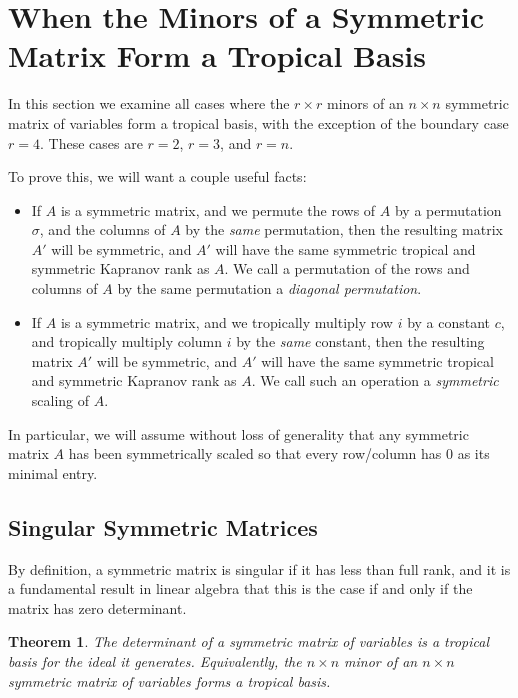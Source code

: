 \documentclass{article}
\begin{document}
\section{When the Minors of a Symmetric Matrix Form a Tropical Basis}

In this section we examine all cases where the $r \times r$ minors of an $n \times n$ symmetric matrix of variables form a tropical basis, with the exception of the boundary case $r = 4$. These cases are $r = 2$, $r = 3$, and $r = n$.

To prove this, we will want a couple useful facts:

\begin{itemize}
  
\item If $A$ is a symmetric matrix, and we permute the rows of $A$ by a permutation $\sigma$, and the columns of $A$ by the \emph{same} permutation, then the resulting matrix $A'$ will be symmetric, and $A'$ will have the same symmetric tropical and symmetric Kapranov rank as $A$. We call a permutation of the rows and columns of $A$ by the same permutation a \emph{diagonal permutation}. 
  
\item If $A$ is a symmetric matrix, and we tropically multiply row $i$ by a constant $c$, and tropically multiply column $i$ by the \emph{same} constant, then the resulting matrix $A'$ will be symmetric, and $A'$ will have the same symmetric tropical and symmetric Kapranov rank as $A$. We call such an operation a \emph{symmetric} scaling of $A$.
  
\end{itemize}

In particular, we will assume without loss of generality that any symmetric matrix $A$ has been symmetrically scaled so that every row/column has $0$ as its minimal entry.

\subsection{Singular Symmetric Matrices}

By definition, a symmetric matrix is singular if it has less than full rank, and it is a fundamental result in linear algebra that this is the case if and only if the matrix has zero determinant.

\newtheorem{thm}{Theorem}
\begin{thm}
  The determinant of a symmetric matrix of variables is a tropical basis for the ideal it generates. Equivalently, the $n \times n$ minor of an $n \times n$ symmetric matrix of variables forms a tropical basis.
\end{thm}
\end{document}
